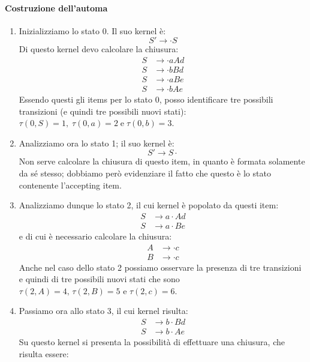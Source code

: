 \documentclass[class=book, crop=false, oneside, 12pt]{standalone}
\begin{document}
\paragraph{Costruzione dell'automa}
\begin{enumerate}
    \item Inizializziamo lo stato 0. Il suo kernel è:
    \begin{equation*}
        S' \to \cdot S
    \end{equation*}
    Di questo kernel devo calcolare la chiusura:
    \begin{align*}
        S &\to \cdot aAd \\
    	S &\to \cdot bBd \\
    	S &\to \cdot aBe \\
    	S &\to \cdot bAe
    \end{align*}
    Essendo questi gli items per lo stato 0, posso identificare tre possibili transizioni (e quindi tre possibili nuovi stati): \(\tau(0,S)=1, \; \tau(0,a)=2 \; \textrm{e} \; \tau(0,b)=3\).
    \item Analizziamo ora lo stato 1; il suo kernel è:
    \begin{equation*}
        S' \to S \cdot    
    \end{equation*}
    Non serve calcolare la chiusura di questo item, in quanto è formata solamente da sé stesso; dobbiamo però evidenziare il fatto che questo è lo stato contenente l'accepting item.
    \item Analizziamo dunque lo stato 2, il cui kernel è popolato da questi item:
    \begin{align*}
        S &\to a \cdot Ad \\
        S &\to a \cdot Be
    \end{align*}
    e di cui è necessario calcolare la chiusura:
    \begin{align*}
        A &\to \cdot c \\
        B &\to \cdot c
    \end{align*}
    Anche nel caso dello stato 2 possiamo osservare la presenza di tre transizioni e quindi di tre possibili nuovi stati che sono \(\tau(2,A)=4 \textrm{, } \tau(2,B)=5 \textrm{ e } \tau(2,c)=6\).
    \item Passiamo ora allo stato 3, il cui kernel risulta:
    \begin{align*}
        S &\to b \cdot Bd \\
        S &\to b \cdot Ae
    \end{align*}
    Su questo kernel si presenta la possibilità di effettuare una chiusura, che risulta essere:

\end{enumerate}
\end{document}
